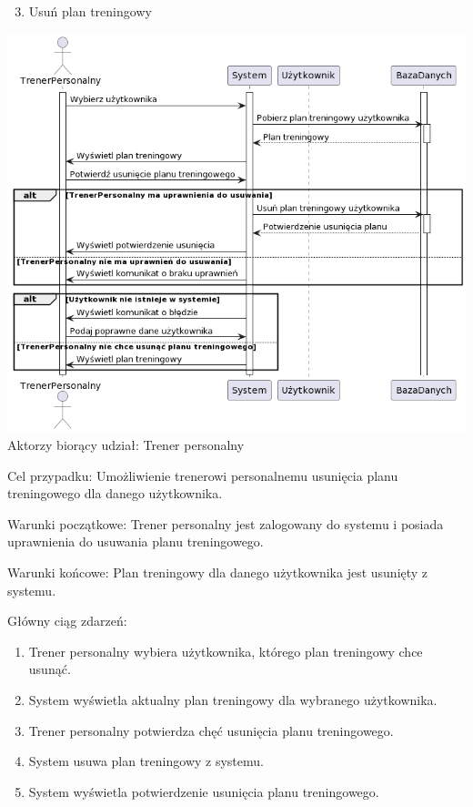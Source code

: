 \documentclass[
]{article}
\providecommand{\tightlist}{%
  \setlength{\itemsep}{0pt}\setlength{\parskip}{0pt}}
\begin{document}
{}

\begin{enumerate}
\setcounter{enumi}{2}
\tightlist
\item
  {Usuń plan treningowy}
\end{enumerate}

{\includegraphics{diagrams/sequence/usun_plan_treningowy.png}}
{Aktorzy biorący udział: Trener personalny}

{Cel przypadku: Umożliwienie trenerowi personalnemu usunięcia planu
treningowego dla danego użytkownika.}

{Warunki początkowe: Trener personalny jest zalogowany do systemu i
posiada uprawnienia do usuwania planu treningowego.}

{Warunki końcowe: Plan treningowy dla danego użytkownika jest usunięty z
systemu.}

{Główny ciąg zdarzeń:}

\begin{enumerate}
\tightlist
\item
  {Trener personalny wybiera użytkownika, którego plan treningowy chce
  usunąć.}
\item
  {System wyświetla aktualny plan treningowy dla wybranego użytkownika.}
\item
  {Trener personalny potwierdza chęć usunięcia planu treningowego.}
\item
  {System usuwa plan treningowy z systemu.}
\item
  {System wyświetla potwierdzenie usunięcia planu treningowego.}
\end{enumerate}
\end{document}
